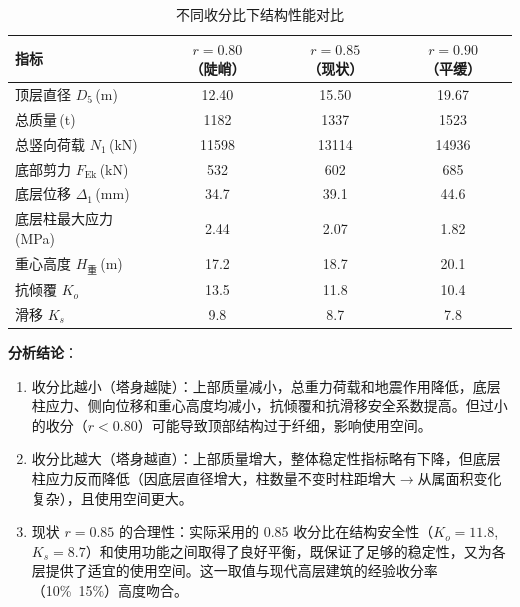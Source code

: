 \documentclass[12pt,a4paper,UTF8]{ctexart}
\begin{document}
\begin{table}[htbp]
    \centering
    \caption{不同收分比下结构性能对比}
    \label{tab:taper}
    \begin{tabular}{lccc}
        \toprule
        指标                         & $r = 0.80$（陡峭） & $r = 0.85$（现状） & $r = 0.90$（平缓） \\
        \midrule
        顶层直径 $D_5$\,(m)            & 12.40          & 15.50          & 19.67          \\
        总质量\,(t)                   & 1182           & 1337           & 1523           \\
        总竖向荷载 $N_1$\,(kN)          & 11598          & 13114          & 14936          \\
        底部剪力 $F_{\text{Ek}}$\,(kN) & 532            & 602            & 685            \\
        底层位移 $\Delta_1$\,(mm)      & 34.7           & 39.1           & 44.6           \\
        底层柱最大应力\,(MPa)             & 2.44           & 2.07           & 1.82           \\
        重心高度 $H_{\text{重}}$\,(m)   & 17.2           & 18.7           & 20.1           \\
        抗倾覆 $K_o$                  & 13.5           & 11.8           & 10.4           \\
        滑移 $K_s$                   & 9.8            & 8.7            & 7.8            \\
        \bottomrule
    \end{tabular}
\end{table}

\textbf{分析结论}：
\begin{enumerate}
    \item 收分比越小（塔身越陡）：上部质量减小，总重力荷载和地震作用降低，底层柱应力、侧向位移和重心高度均减小，抗倾覆和抗滑移安全系数提高。但过小的收分（$r < 0.80$）可能导致顶部结构过于纤细，影响使用空间。
    \item 收分比越大（塔身越直）：上部质量增大，整体稳定性指标略有下降，但底层柱应力反而降低（因底层直径增大，柱数量不变时柱距增大$\to$从属面积变化复杂），且使用空间更大。
    \item 现状 $r = 0.85$ 的合理性：实际采用的 0.85 收分比在结构安全性（$K_o = 11.8$, $K_s = 8.7$）和使用功能之间取得了良好平衡，既保证了足够的稳定性，又为各层提供了适宜的使用空间。这一取值与现代高层建筑的经验收分率（10\%~15\%）高度吻合。
\end{enumerate}
\end{document}
